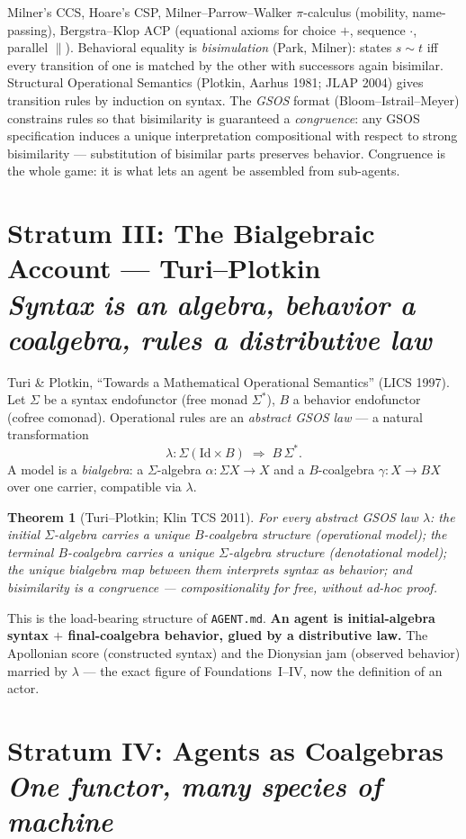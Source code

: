 \documentclass[11pt]{article}
\theoremstyle{plain}
\newtheorem{theorem}{Theorem}[section]
\theoremstyle{definition}
\theoremstyle{remark}
\newcommand{\stratum}[2]{\section{#1\\ {\normalsize\normalfont\itshape #2}}}
\begin{document}
Milner's CCS, Hoare's CSP, Milner--Parrow--Walker $\pi$-calculus (mobility, name-passing), Bergstra--Klop ACP (equational axioms for choice $+$, sequence $\cdot$, parallel $\parallel$). Behavioral equality is \emph{bisimulation} (Park, Milner): states $s \sim t$ iff every transition of one is matched by the other with successors again bisimilar. Structural Operational Semantics (Plotkin, Aarhus 1981; JLAP 2004) gives transition rules by induction on syntax. The \emph{GSOS} format (Bloom--Istrail--Meyer) constrains rules so that bisimilarity is guaranteed a \emph{congruence}: any GSOS specification induces a unique interpretation compositional with respect to strong bisimilarity --- substitution of bisimilar parts preserves behavior. Congruence is the whole game: it is what lets an agent be assembled from sub-agents.

\stratum{Stratum III: The Bialgebraic Account --- Turi--Plotkin}{Syntax is an algebra, behavior a coalgebra, rules a distributive law}

Turi \& Plotkin, ``Towards a Mathematical Operational Semantics'' (LICS 1997). Let $\Sigma$ be a syntax endofunctor (free monad $\Sigma^{*}$), $B$ a behavior endofunctor (cofree comonad). Operational rules are an \emph{abstract GSOS law} --- a natural transformation
\[
\lambda\colon \Sigma(\mathrm{Id}\times B)\;\Longrightarrow\; B\,\Sigma^{*}.
\]
A model is a \emph{bialgebra}: a $\Sigma$-algebra $\alpha\colon \Sigma X \to X$ and a $B$-coalgebra $\gamma\colon X \to BX$ over one carrier, compatible via $\lambda$.

\begin{theorem}[Turi--Plotkin; Klin TCS 2011]\label{thm:tp}
For every abstract GSOS law $\lambda$: the initial $\Sigma$-algebra carries a unique $B$-coalgebra structure (operational model); the terminal $B$-coalgebra carries a unique $\Sigma$-algebra structure (denotational model); the unique bialgebra map between them interprets syntax as behavior; and \emph{bisimilarity is a congruence} --- compositionality for free, without ad-hoc proof.
\end{theorem}

This is the load-bearing structure of \texttt{AGENT.md}. \textbf{An agent is initial-algebra syntax $+$ final-coalgebra behavior, glued by a distributive law.} The Apollonian score (constructed syntax) and the Dionysian jam (observed behavior) married by $\lambda$ --- the exact figure of Foundations~I--IV, now the definition of an actor.

\stratum{Stratum IV: Agents as Coalgebras}{One functor, many species of machine}
\end{document}
